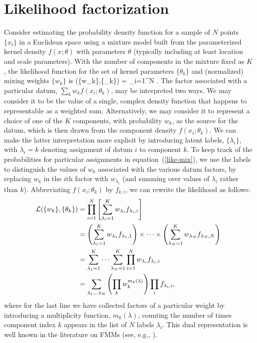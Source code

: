 \section{Likelihood factorization}
\label{app:like}

Consider estimating the probability density function for a sample of $N$
points $\{x_i\}$ in a Euclidean space using a mixture model built from the
parameterized kernel density $f(x;\theta)$ with parameters $\theta$
(typically including at least location and scale parameters).  With the
number of components in the mixture fixed as $K$, the likelihood function
for the set of kernel parameters $\{\theta_k\}$ and (normalized) mixing
weights $\{w_k\}$ is
\be
\like(\{w_k\},\{\theta_k\}) = 
  \prod_{i=1}^N \left[ \sum_{k=1}^K w_k f(x_i;\theta_k) \right].
\label{like-mix}
\ee
The factor associated with a particular datum, $\sum_k w_k f(x_i;\theta_k)$,
may be interpreted two ways. We may consider it to be the value of a single,
complex density function that happens to representable as a weighted sum.
Alternatively, we may consider it to represent a choice of one of the $K$
components, with probability $w_k$, as the source for the datum, which is
then drawn from the component density $f(x_i; \theta_k)$.  We can make
the latter interpretation more explicit by introducing latent labels,
$\{\lambda_i\}$, with $\lambda_i = k$ denoting assignment of datum $i$
to component $k$.  To keep track of the probabilities for particular
assignments in equation~(\ref{like-mix}), we use the labels to
distinguish the values of $w_k$ associated with the various datum
factors, by replacing $w_k$ in the $i$th factor with $w_{\lambda_i}$
(and summing over values of $\lambda_i$ rather than $k$).
Abbreviating $f(x_i;\theta_k)$ by $f_{k,i}$, we can rewrite
the likelihood as follows:
\begin{align}
\like(\{w_k\},\{\theta_k\})
  &= \prod_{i=1}^N \left[ \sum_{\lambda_i=1}^{K} w_{\lambda_i}
          {f}_{\lambda_i, i} \right]\\
  &= \left(\sum_{\lambda_1=1}^{K} w_{\lambda_1}
          {f}_{\lambda_1, 1}\right) \times\cdots\times
     \left(\sum_{\lambda_N=1}^{K} w_{\lambda_N}
          {f}_{\lambda_N, N}\right)\nonumber\\
  &= \sum_{\lambda_1=1}^{K} \cdots \sum_{\lambda_N=1}^{K}
     \prod_{i=1}^N w_{\lambda_i} {f}_{\lambda_i, i}\nonumber\\
  &= \sum_{\lambda_1\ldots\lambda_N}
     \left( \prod_k w_k^{m_k(\lambda)}\right)
    \prod_i {f}_{\lambda_i, i},\nonumber
\label{product-sum}
\end{align}
where for the last line we have collected factors of a particular weight by
introducing a multiplicity function, $m_k(\lambda)$, counting the number of
times component index $k$ appears in the list of $N$ labels $\lambda_i$.
This dual representation is well known in the literature on FMMs
(see, e.g., \cite{BG88-BayesFMM}).

